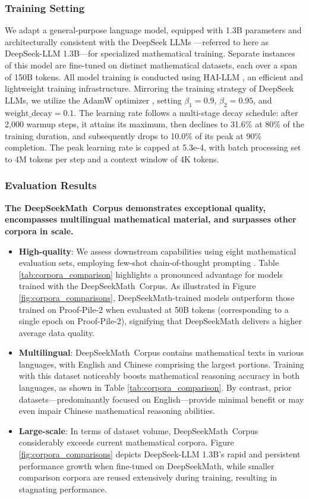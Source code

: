\subsubsection{Training Setting}
\label{sec:quality-policy}
We adapt a general-purpose language model, equipped with 1.3B parameters and architecturally consistent with the DeepSeek LLMs \citep{deepseek-llm}—referred to here as DeepSeek-LLM 1.3B—for specialized mathematical training. Separate instances of this model are fine-tuned on distinct mathematical datasets, each over a span of 150B tokens. All model training is conducted using HAI-LLM \citep{haillm}, an efficient and lightweight training infrastructure. Mirroring the training strategy of DeepSeek LLMs, we utilize the AdamW optimizer \citep{adamW}, setting $\beta_1=0.9$, $\beta_2=0.95$, and $\mathrm{weight\_decay}=0.1$. The learning rate follows a multi-stage decay schedule: after 2,000 warmup steps, it attains its maximum, then declines to 31.6\% at 80\% of the training duration, and subsequently drops to 10.0\% of its peak at 90\% completion. The peak learning rate is capped at 5.3e-4, with batch processing set to 4M tokens per step and a context window of 4K tokens.

\subsubsection{Evaluation Results}

\textbf{The DeepSeekMath~Corpus demonstrates exceptional quality, encompasses multilingual mathematical material, and surpasses other corpora in scale.}

\begin{itemize}[topsep=0pt]
    \item \textbf{High-quality}: 
    We assess downstream capabilities using eight mathematical evaluation sets, employing few-shot chain-of-thought prompting \cite{cot}. Table \ref{tab:corpora_comparison} highlights a pronounced advantage for models trained with the DeepSeekMath~Corpus. As illustrated in Figure \ref{fig:corpora_comparisons}, DeepSeekMath-trained models outperform those trained on Proof-Pile-2 when evaluated at 50B tokens (corresponding to a single epoch on Proof-Pile-2), signifying that DeepSeekMath delivers a higher average data quality.
    \item \textbf{Multilingual}: 
    DeepSeekMath~Corpus contains mathematical texts in various languages, with English and Chinese comprising the largest portions. Training with this dataset noticeably boosts mathematical reasoning accuracy in both languages, as shown in Table \ref{tab:corpora_comparison}. By contrast, prior datasets—predominantly focused on English—provide minimal benefit or may even impair Chinese mathematical reasoning abilities.
    \item \textbf{Large-scale}: 
    In terms of dataset volume, DeepSeekMath~Corpus considerably exceeds current mathematical corpora. Figure \ref{fig:corpora_comparisons} depicts DeepSeek-LLM 1.3B's rapid and persistent performance growth when fine-tuned on DeepSeekMath, while smaller comparison corpora are reused extensively during training, resulting in stagnating performance.
\end{itemize}

